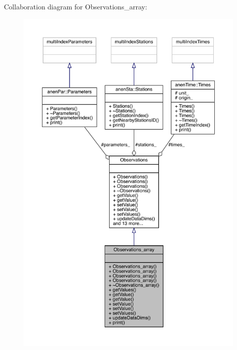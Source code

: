 Collaboration diagram for Observations\+\_\+array\+:\nopagebreak
\begin{figure}[H]
\begin{center}
\leavevmode
\includegraphics[width=350pt]{class_observations__array__coll__graph}
\end{center}
\end{figure}

